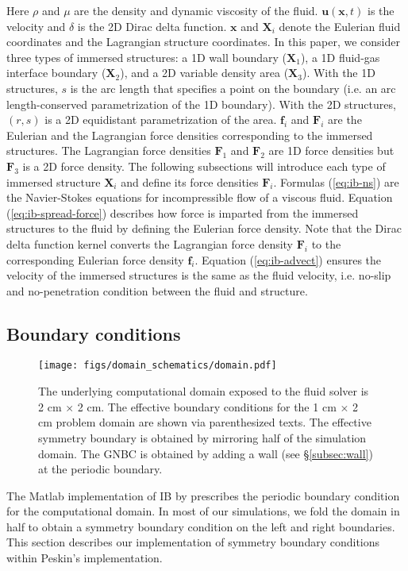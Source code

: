 \documentclass{jfm}
\begin{document}
Here $\rho$ and $\mu$ are the density and dynamic viscosity of the fluid. $\boldsymbol{u}(\boldsymbol{x},t)$ is the velocity and $\delta$ is the 2D Dirac delta function. $\boldsymbol{x}$ and $\boldsymbol{X}_i$ denote the Eulerian fluid coordinates and the Lagrangian structure coordinates. In this paper, we consider three types of immersed structures: a 1D wall boundary ($\bm{X}_1$), a 1D fluid-gas interface boundary ($\bm{X}_2$), and a 2D variable density area ($\bm{X}_3$). With the 1D structures, $s$ is the arc length that specifies a point on the boundary (i.e. an arc length-conserved parametrization of the 1D boundary). With the 2D structures, $(r,s)$ is a 2D equidistant parametrization of the area. $\boldsymbol{f}_i$ and $\boldsymbol{F}_i$ are the Eulerian and the Lagrangian force densities corresponding to the immersed structures. The Lagrangian force densities $\boldsymbol{F}_1$ and $\boldsymbol{F}_2$ are 1D force densities but $\boldsymbol{F}_3$ is a 2D force density. The following subsections will introduce each type of immersed structure $\boldsymbol{X}_i$ and define its force densities $\boldsymbol{F}_i$. Formulas  (\ref{eq:ib-ns}) are the Navier-Stokes equations for incompressible flow of a viscous fluid. Equation (\ref{eq:ib-spread-force}) describes how force is imparted from the immersed structures to the fluid by defining the Eulerian force density. Note that the Dirac delta function kernel converts the Lagrangian force density $\bm{F}_i$ to the corresponding Eulerian force density $\bm{f}_i$. Equation (\ref{eq:ib-advect}) ensures the velocity of the immersed structures is the same as the fluid velocity, i.e. no-slip and no-penetration condition between the fluid and structure. 



\subsection {Boundary conditions} \label{sec:bc}
\begin{figure}
\centering
\texttt{[image: figs/domain\_schematics/domain.pdf]}
\caption{\footnotesize The underlying computational domain exposed to the fluid solver is 2 cm $\times$ 2 cm. The effective boundary conditions for the 1 cm $\times$ 2 cm problem domain are shown via parenthesized texts. The effective symmetry boundary is obtained by mirroring half of the simulation domain. The GNBC is obtained by adding a wall (see \S\ref{subsec:wall}) at the periodic boundary.}
\label{fig:domain}
\end{figure}
The Matlab implementation of IB by \citet{ib_matlab} prescribes the periodic boundary condition for the computational domain. In most of our simulations, we fold the domain in half to obtain a symmetry boundary condition on the left and right boundaries. This section describes our implementation of symmetry boundary conditions within Peskin's implementation. 
\end{document}
